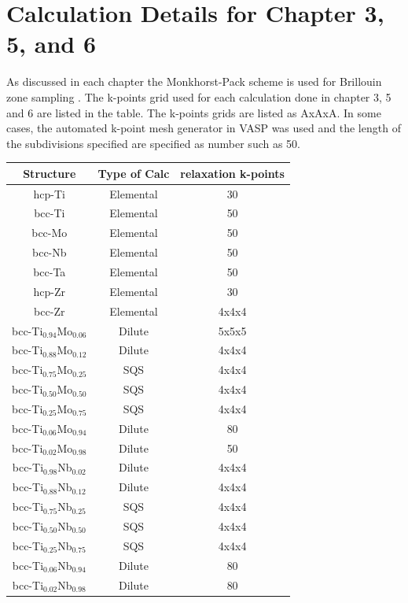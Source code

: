 
\section*{Calculation Details for Chapter 3, 5, and 6}
As discussed in each chapter the Monkhorst-Pack scheme is used for Brillouin zone sampling \cite{Kresse1996,Monkhorst1976a}. The k-points grid used for each calculation done in chapter 3, 5 and 6 are listed in the table. The k-points grids are listed as AxAxA. In some cases, the automated k-point mesh generator in VASP was used and the length of the subdivisions specified are specified as number such as 50. 

\begin{longtable}[H]{ c c c }
	\hline
	Structure & Type of Calc & relaxation k-points\\
	\hline
	\endhead
	\hline
	\endfoot
	hcp-Ti & Elemental & 30 \\
	bcc-Ti & Elemental & 50 \\
	bcc-Mo & Elemental & 50 \\
	bcc-Nb & Elemental & 50 \\
	bcc-Ta & Elemental & 50 \\
	hcp-Zr & Elemental & 30 \\
	bcc-Zr & Elemental & 4x4x4 \\
	bcc-Ti$_{0.94}$Mo$_{0.06}$ & Dilute & 5x5x5 \\
	bcc-Ti$_{0.88}$Mo$_{0.12}$ & Dilute & 4x4x4\\
	bcc-Ti$_{0.75}$Mo$_{0.25}$ & SQS & 4x4x4\\
	bcc-Ti$_{0.50}$Mo$_{0.50}$ & SQS & 4x4x4\\
	bcc-Ti$_{0.25}$Mo$_{0.75}$ & SQS & 4x4x4\\
	bcc-Ti$_{0.06}$Mo$_{0.94}$ & Dilute & 80\\
	bcc-Ti$_{0.02}$Mo$_{0.98}$ & Dilute & 50\\
	bcc-Ti$_{0.98}$Nb$_{0.02}$ & Dilute & 4x4x4\\
	bcc-Ti$_{0.88}$Nb$_{0.12}$ & Dilute & 4x4x4\\ 
	bcc-Ti$_{0.75}$Nb$_{0.25}$ & SQS & 4x4x4\\
	bcc-Ti$_{0.50}$Nb$_{0.50}$ & SQS & 4x4x4\\
	bcc-Ti$_{0.25}$Nb$_{0.75}$ & SQS & 4x4x4\\
	bcc-Ti$_{0.06}$Nb$_{0.94}$ & Dilute & 80\\
	bcc-Ti$_{0.02}$Nb$_{0.98}$ & Dilute & 80\\

\end{longtable}
